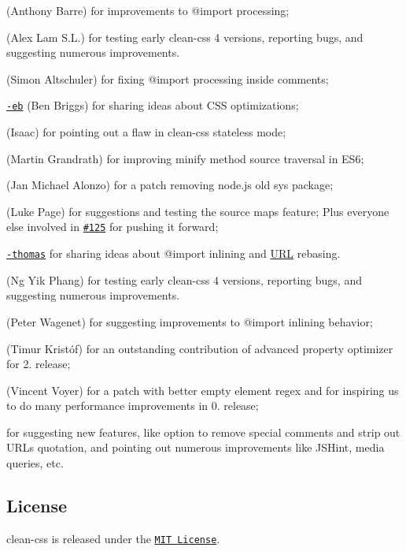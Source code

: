 \begin{DoxyItemize}
\item \href{https://github.com/abarre}{\tt } (Anthony Barre) for improvements to {\ttfamily @import} processing;
\item \href{https://github.com/alexlamsl}{\tt } (Alex Lam S.\+L.) for testing early clean-\/css 4 versions, reporting bugs, and suggesting numerous improvements.
\item \href{https://github.com/altschuler}{\tt } (Simon Altschuler) for fixing {\ttfamily @import} processing inside comments;
\item \href{https://github.com/ben-eb}{\tt -\/eb} (Ben Briggs) for sharing ideas about C\+SS optimizations;
\item \href{https://github.com/facelessuser}{\tt } (Isaac) for pointing out a flaw in clean-\/css\textquotesingle{} stateless mode;
\item \href{https://github.com/grandrath}{\tt } (Martin Grandrath) for improving {\ttfamily minify} method source traversal in E\+S6;
\item \href{https://github.com/jmalonzo}{\tt } (Jan Michael Alonzo) for a patch removing node.\+js\textquotesingle{} old {\ttfamily sys} package;
\item \href{https://github.com/lukeapage}{\tt } (Luke Page) for suggestions and testing the source maps feature; Plus everyone else involved in \href{https://github.com/jakubpawlowicz/clean-css/issues/125}{\tt \#125} for pushing it forward;
\item \href{https://github.com/madwizard-thomas}{\tt -\/thomas} for sharing ideas about {\ttfamily @import} inlining and \mbox{\hyperlink{namespace_u_r_l}{U\+RL}} rebasing.
\item \href{https://github.com/ngyikp}{\tt } (Ng Yik Phang) for testing early clean-\/css 4 versions, reporting bugs, and suggesting numerous improvements.
\item \href{https://github.com/wagenet}{\tt } (Peter Wagenet) for suggesting improvements to {\ttfamily @import} inlining behavior;
\item \href{https://github.com/venemo}{\tt } (Timur Kristóf) for an outstanding contribution of advanced property optimizer for 2. release;
\item \href{https://github.com/vvo}{\tt } (Vincent Voyer) for a patch with better empty element regex and for inspiring us to do many performance improvements in 0. release;
\item \href{https://github.com/xhmikosr}{\tt } for suggesting new features, like option to remove special comments and strip out U\+R\+Ls quotation, and pointing out numerous improvements like J\+S\+Hint, media queries, etc.
\end{DoxyItemize}

\subsection*{License}

clean-\/css is released under the \href{https://github.com/jakubpawlowicz/clean-css/blob/master/LICENSE}{\tt M\+IT License}. 